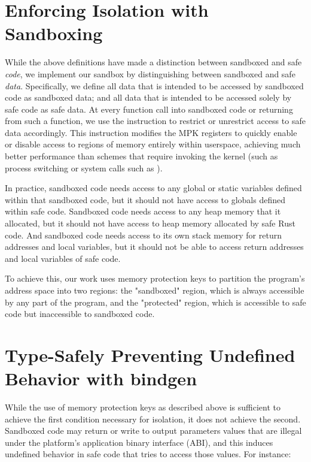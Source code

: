 \section{Enforcing Isolation with Sandboxing}

While the above definitions have made a distinction between sandboxed and safe \textit{code}, we
implement our sandbox by distinguishing between sandboxed and safe \textit{data}. Specifically, we
define all data that is intended to be accessed by sandboxed code as sandboxed data; and all data
that is intended to be accessed solely by safe code as safe data. At every function call into
sandboxed code or returning from such a function, we use the  instruction to restrict or
unrestrict access to safe data accordingly. This instruction modifies the MPK registers to quickly
enable or disable access to regions of memory entirely within userspace, achieving much better
performance than schemes that require invoking the kernel (such as process switching or system calls
such as ).

In practice, sandboxed code needs access to any global or static variables defined within that
sandboxed code, but it should not have access to globals defined within safe code. Sandboxed code
needs access to any heap memory that it allocated, but it should not have access to heap memory
allocated by safe Rust code. And sandboxed code needs access to its own stack memory for return
addresses and local variables, but it should not be able to access return addresses and local
variables of safe code.

To achieve this, our work uses memory protection keys to partition the program's address space into
two regions: the "sandboxed" region, which is always accessible by any part of the program, and the
"protected" region, which is accessible to safe code but inaccessible to sandboxed code.

\section{Type-Safely Preventing Undefined Behavior with bindgen}

While the use of memory protection keys as described above is sufficient to achieve the first
condition necessary for isolation, it does not achieve the second. Sandboxed code may return or
write to output parameters values that are illegal under the platform's application binary interface
(ABI), and this induces undefined behavior in safe code that tries to access those values. For
instance:

